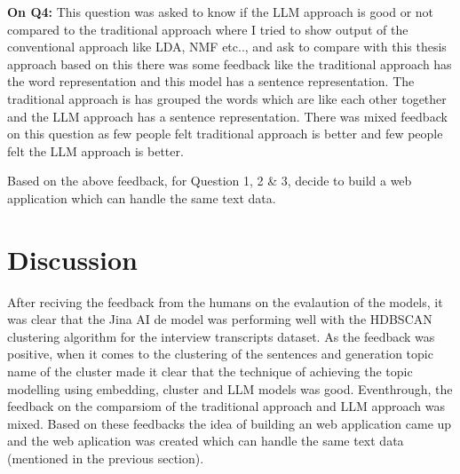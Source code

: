 \noindent\textbf{On Q4:} This question was asked to know if the LLM approach is good or not compared to the traditional approach where I tried to show output of the conventional approach like LDA, NMF etc.., and 
ask to compare with this thesis approach based on this there was some feedback like the traditional approach has the word representation and this model has a sentence representation. The traditional approach is 
has grouped the words which are like each other together and the LLM approach has a sentence representation. There was mixed feedback on this question as few people felt traditional approach is better and few people
felt the LLM approach is better.


Based on the above feedback, for Question 1, 2 \& 3, decide to build a web application which can handle the same text data. 


\section{Discussion}

After reciving the feedback from the humans on the evalaution of the models, it was clear that the Jina AI de model was performing well
with the HDBSCAN clustering algorithm for the interview transcripts dataset. As the feedback was positive, when it comes to the clustering of the sentences
and generation topic name of the cluster made it clear that the technique of achieving the topic modelling using embedding, cluster and LLM models was good.
Eventhrough, the feedback on the comparsiom of the traditional approach and LLM approach was mixed. Based on these feedbacks the idea of building an web application
came up and the web aplication was created which can handle the same text data (mentioned in the previous section).

